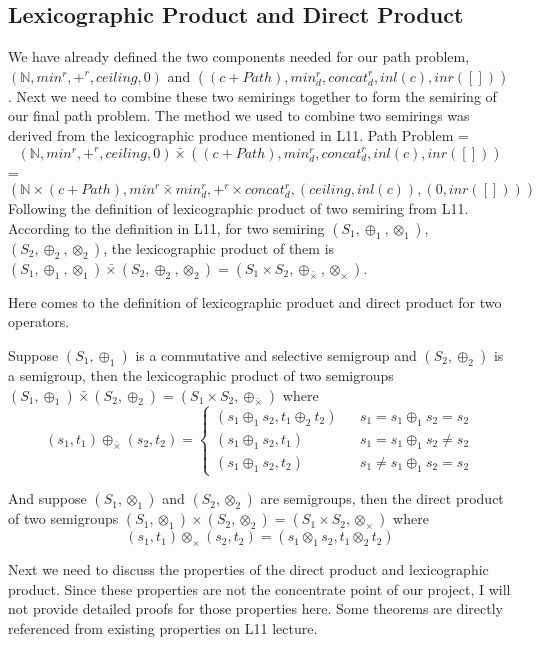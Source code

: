 \documentclass[a4paper,10pt]{article}
\begin{document}
\subsection{Lexicographic Product and Direct Product}
We have already defined the two components needed for our path problem, $(\mathbb{N},min^r,+^r,ceiling,0)$ and $((c + Path),min^r_d,concat^r_d,inl(c),inr([]))$. 
Next we need to combine these two semirings together to form the semiring of our final path problem. The method we used to combine two semirings was derived from the lexicographic produce mentioned in L11. Path Problem =
\[(\mathbb{N},min^r,+^r,ceiling,0) \bar{\times} ((c + Path),min^r_d,concat^r_d,inl(c),inr([]))\]
=
\[(\mathbb{N} \times (c + Path), min^r \bar{\times} min^r_d, +^r \times concat^r_d, (ceiling,inl(c)), (0,inr([])))\]
Following the definition of lexicographic product of two semiring from L11.
According to the definition in L11, for two semiring $(S_1,\oplus_1,\otimes_1)$,$(S_2,\oplus_2,\otimes_2)$, the lexicographic product of them is $(S_1,\oplus_1,\otimes_1) \bar{\times} (S_2,\oplus_2,\otimes_2) = (S_1\times S_2, \oplus_{\bar{\times}}, \otimes_\times)$.

Here comes to the definition of lexicographic product and direct product for two operators. 

Suppose $(S_1,\oplus_1)$ is a commutative and selective semigroup and $(S_2,\oplus_2)$ is a semigroup, then the lexicographic product of two semigroups $(S_1,\oplus_1) \bar{\times} (S_2,\oplus_2) = (S_1\times S_2, \oplus_{\bar{\times}})$ where
\[(s_1,t_1) \oplus_{\bar{\times}} (s_2,t_2)=\left\{
\begin{array}{rcl}
(s_1\oplus_1 s_2,t_1\oplus_2 t_2)      &      & { s_1 = s_1 \oplus_1 s_2 = s_2}\\
(s_1\oplus_1 s_2,t_1)       &      & {s_1 = s_1 \oplus_1 s_2 \neq s_2}\\
(s_1\oplus_1 s_2,t_2)       &      & {s_1 \neq s_1 \oplus_1 s_2 = s_2}
\end{array} \right.\]

And suppose $(S_1,\otimes_1)$ and $(S_2,\otimes_2)$ are semigroups, then the direct product of two semigroups $(S_1,\otimes_1) \times (S_2,\otimes_2) = (S_1\times S_2, \otimes_\times)$ where
\[(s_1,t_1) \otimes_\times (s_2,t_2)= (s_1 \otimes_1 s_2, t_1\otimes_2 t_2)\]

Next we need to discuss the properties of the direct product and lexicographic product. Since these properties are not the concentrate point of our project, I will not provide detailed proofs for those properties here. Some theorems are directly referenced from existing properties on L11 lecture.
\end{document}
